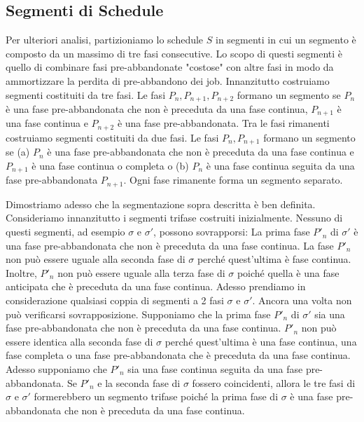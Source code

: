 \documentclass[twoside,openany,titlepage,fleqn,
	headinclude,12pt,a4paper,BCOR5mm,footinclude]{scrbook}
\begin{document}
\subsection{Segmenti di Schedule}
Per ulteriori analisi, partizioniamo lo schedule $S$ in segmenti in cui un segmento è composto da un massimo di tre fasi consecutive. Lo scopo di questi segmenti è quello di combinare fasi pre-abbandonate "costose" con altre fasi in modo da ammortizzare la perdita di pre-abbandono dei job. Innanzitutto costruiamo segmenti costituiti da tre fasi. Le fasi $P_{n}, P_{n + 1}, P_{n + 2}$ formano un segmento se $P_{n}$ è una fase pre-abbandonata che non è preceduta da una fase continua, $P_{n + 1}$ è una fase continua e $P_{n + 2}$ è una fase pre-abbandonata. Tra le fasi rimanenti costruiamo segmenti costituiti da due fasi. Le fasi $P_{n}, P_{n + 1}$ formano un segmento se (a) $P_{n}$ è una fase pre-abbandonata che non è preceduta da una fase continua e $P_{n + 1}$ è una fase continua o completa o (b) $P_{n}$ è una fase continua seguita da una fase pre-abbandonata $P_{n + 1}$. Ogni fase rimanente forma un segmento separato. 

Dimostriamo adesso che la segmentazione sopra descritta è ben definita. Consideriamo innanzitutto i segmenti trifase costruiti inizialmente. Nessuno di questi segmenti, ad esempio $\sigma$ e $\sigma'$, possono sovrapporsi: La prima fase $P'_{n}$ di $\sigma'$ è una fase pre-abbandonata che non è preceduta da una fase continua. La fase $P'_{n}$ non può essere uguale alla seconda fase di $\sigma$ perché quest'ultima è fase continua. Inoltre, $P'_{n}$ non può essere uguale alla terza fase di $\sigma$ poiché quella è una fase anticipata che è preceduta da una fase continua. Adesso prendiamo in considerazione qualsiasi coppia di segmenti a 2 fasi $\sigma$ e $\sigma'$. Ancora una volta non può verificarsi sovrapposizione. Supponiamo che la prima fase $P'_{n}$ di $\sigma'$ sia una fase pre-abbandonata che non è preceduta da una fase continua. $P'_{n}$ non può essere identica alla seconda fase di $\sigma$ perché quest'ultima è una fase continua, una fase completa o una fase pre-abbandonata che è preceduta da una fase continua. Adesso supponiamo che $P'_{n}$ sia una fase continua seguita da una fase pre-abbandonata. Se $P'_{n}$ e la seconda fase di $\sigma$ fossero coincidenti, allora le tre fasi di $\sigma$ e $\sigma'$ formerebbero un segmento trifase poiché la prima fase di $\sigma$ è una fase pre-abbandonata che non è preceduta da una fase continua.
\end{document}
